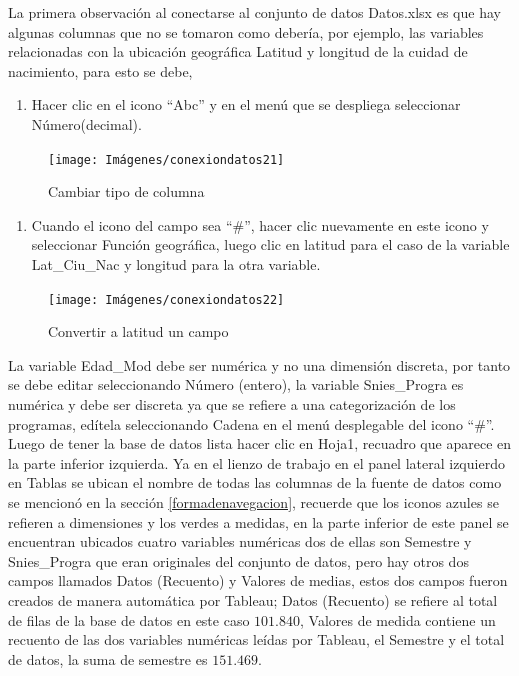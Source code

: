 \documentclass[
]{book}
\providecommand{\tightlist}{%
  \setlength{\itemsep}{0pt}\setlength{\parskip}{0pt}}
\begin{document}
La primera observación al conectarse al conjunto de datos Datos.xlsx es que hay algunas columnas que no se tomaron como debería, por ejemplo, las variables relacionadas con la ubicación geográfica Latitud y longitud de la cuidad de nacimiento, para esto se debe,

\begin{enumerate}
\def\labelenumi{\arabic{enumi}.}
\tightlist
\item
  Hacer clic en el icono ``Abc'' y en el menú que se despliega seleccionar Número(decimal).
\end{enumerate}

\begin{figure}

{\centering \texttt{[image: Imágenes/conexiondatos21]} 

}

\caption{Cambiar tipo de columna}\label{fig:geograficas-fig}
\end{figure}

\begin{enumerate}
\def\labelenumi{\arabic{enumi}.}
\setcounter{enumi}{1}
\tightlist
\item
  Cuando el icono del campo sea ``\#'', hacer clic nuevamente en este icono y seleccionar Función geográfica, luego clic en latitud para el caso de la variable Lat\_Ciu\_Nac y longitud para la otra variable.
\end{enumerate}

\begin{figure}

{\centering \texttt{[image: Imágenes/conexiondatos22]} 

}

\caption{Convertir a latitud un campo}\label{fig:geograficolatitud-fig}
\end{figure}

La variable Edad\_Mod debe ser numérica y no una dimensión discreta, por tanto se debe editar seleccionando Número (entero), la variable Snies\_Progra es numérica y debe ser discreta ya que se refiere a una categorización de los programas, edítela seleccionando Cadena en el menú desplegable del icono ``\#''. Luego de tener la base de datos lista hacer clic en Hoja1, recuadro que aparece en la parte inferior izquierda. Ya en el lienzo de trabajo en el panel lateral izquierdo en Tablas se ubican el nombre de todas las columnas de la fuente de datos como se mencionó en la sección \ref{formadenavegacion}, recuerde que los iconos azules se refieren a dimensiones y los verdes a medidas, en la parte inferior de este panel se encuentran ubicados cuatro variables numéricas dos de ellas son Semestre y Snies\_Progra que eran originales del conjunto de datos, pero hay otros dos campos llamados Datos (Recuento) y Valores de medias, estos dos campos fueron creados de manera automática por Tableau; Datos (Recuento) se refiere al total de filas de la base de datos en este caso \(101.840\), Valores de medida contiene un recuento de las dos variables numéricas leídas por Tableau, el Semestre y el total de datos, la suma de semestre es \(151.469\).
\end{document}

